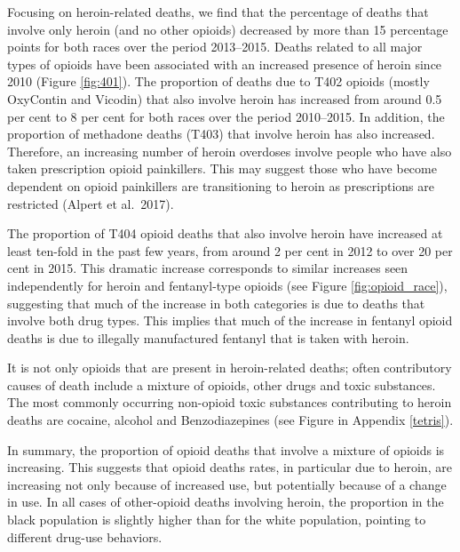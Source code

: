 \documentclass[12pt, a4paper]{article}
\begin{document}
Focusing on heroin-related deaths, we find that the percentage of deaths that involve only heroin (and no other opioids) decreased by more than 15 percentage points for both races over the period 2013--2015. Deaths related to all major types of opioids have been associated with an increased presence of heroin since 2010 (Figure \ref{fig:401}). The proportion of deaths due to T402 opioids (mostly OxyContin and Vicodin) that also involve heroin has increased from around 0.5 per cent to 8 per cent for both races over the period 2010--2015. In addition, the proportion of methadone deaths (T403) that involve heroin has also increased. Therefore, an increasing number of heroin overdoses involve people who have also taken prescription opioid painkillers. This may suggest those who have become dependent on opioid painkillers are transitioning to heroin as prescriptions are restricted (Alpert et al.\ 2017).

The proportion of T404 opioid deaths that also involve heroin have increased at least ten-fold in the past few years, from around 2 per cent in 2012 to over 20 per cent in 2015. This dramatic increase corresponds to similar increases seen independently for heroin and fentanyl-type opioids (see Figure \ref{fig:opioid_race}), suggesting that much of the increase in both categories is due to deaths that involve both drug types. This implies that much of the increase in fentanyl opioid deaths is due to illegally manufactured fentanyl that is taken with heroin.  

It is not only opioids that are present in heroin-related deaths; often contributory causes of death include a mixture of opioids, other drugs and toxic substances. The most commonly occurring non-opioid toxic substances contributing to heroin deaths are cocaine, alcohol and Benzodiazepines (see Figure in Appendix \ref{tetris}). 

In summary, the proportion of opioid deaths that involve a mixture of opioids is increasing. This suggests that opioid deaths rates, in particular due to heroin, are increasing not only because of increased use, but potentially because of a change in use. In all cases of other-opioid deaths involving heroin, the proportion in the black population is slightly higher than for the white population, pointing to different drug-use behaviors. 
\end{document}
